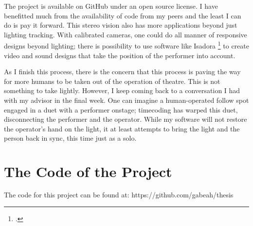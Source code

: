 \documentclass[
    12pt,
    twoside,
    bibstyle=chicago,
    headerstyle=uppercase,
	bibfile=biblatex_updating.bib
]{reedthesis}
\begin{document}
The project is available on GitHub under an open source license. I have benefitted much from the availability of code from my peers and the least I can do is pay it forward. This stereo vision also has more applications beyond just lighting tracking. With calibrated cameras, one could do all manner of responsive designs beyond lighting; there is possibility to use software like Isadora \footcite{TROIKATRONIXISADORA2025} to create video and sound designs that take the position of the performer into account.

As I finish this process, there is the concern that this process is paving the way for more humans to be taken out of the operation of theatre. This is not something to take lightly. However, I keep coming back to a conversation I had with my advisor in the final week. One can imagine a human-operated follow spot engaged in a duet with a performer onstage; timecoding has warped this duet, disconnecting the performer and the operator. While my software will not restore the operator's hand on the light, it at least attempts to bring the light and the person back in sync, this time just as a solo.

\appendix
\chapter{The Code of the Project}
The code for this project can be found at: https://github.com/gabeah/thesis


  \backmatter %

    \nocite{*}


%  
 \printbibliography[heading=bibintoc]

\end{document}
